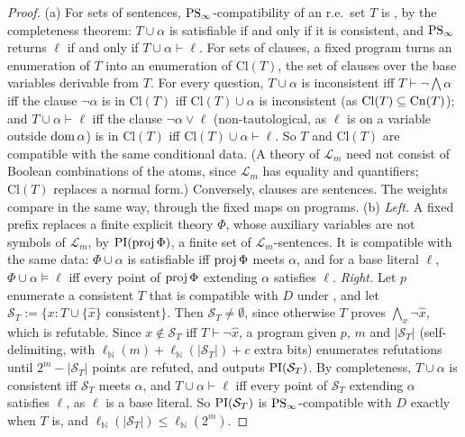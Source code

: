 \begin{proof}
(a) For sets of sentences, $\mathrm{PS}_\infty$-compatibility of an r.e.\ set $T$ is \Ethree, by the completeness theorem: $T\cup\alpha$ is satisfiable if and only if it is consistent, and $\mathrm{PS}_\infty$ returns $\ell$ if and only if $T\cup\alpha\vdash\ell$. For sets of clauses, a fixed program turns an enumeration of $T$ into an enumeration of $\mathrm{Cl}(T)$, the set of clauses over the base variables derivable from $T$. For every question, $T\cup\alpha$ is inconsistent iff $T\vdash\neg\bigwedge\alpha$ iff the clause $\neg\alpha$ is in $\mathrm{Cl}(T)$ iff $\mathrm{Cl}(T)\cup\alpha$ is inconsistent (as $\mathrm{Cl}(T)\subseteq\mathrm{Cn}(T)$); and $T\cup\alpha\vdash\ell$ iff the clause $\neg\alpha\vee\ell$ (non-tautological, as $\ell$ is on a variable outside $\operatorname{dom}\alpha$) is in $\mathrm{Cl}(T)$ iff $\mathrm{Cl}(T)\cup\alpha\vdash\ell$. So $T$ and $\mathrm{Cl}(T)$ are compatible with the same conditional data. (A theory of $\mathcal L_m$ need not consist of Boolean combinations of the atoms, since $\mathcal L_m$ has equality and quantifiers; $\mathrm{Cl}(T)$ replaces a normal form.) Conversely, clauses are sentences. The weights compare in the same way, through the fixed maps on programs.
(b) \emph{Left.} A fixed prefix replaces a finite explicit theory $\Phi$, whose auxiliary variables are not symbols of $\mathcal L_m$, by $\mathrm{PI}(\operatorname{proj}\Phi)$, a finite set of $\mathcal L_m$-sentences. It is compatible with the same data: $\Phi\cup\alpha$ is satisfiable iff $\operatorname{proj}\Phi$ meets $\alpha$, and for a base literal $\ell$, $\Phi\cup\alpha\models\ell$ iff every point of $\operatorname{proj}\Phi$ extending $\alpha$ satisfies $\ell$. \emph{Right.} Let $p$ enumerate a consistent $T$ that is compatible with $D$ under \Ethree, and let $\mathcal S_T:=\{x:T\cup\{\hat x\}\text{ consistent}\}$. Then $\mathcal S_T\ne\emptyset$, since otherwise $T$ proves $\bigwedge_x\neg\hat x$, which is refutable. Since $x\notin\mathcal S_T$ iff $T\vdash\neg\hat x$, a program given $p$, $m$ and $\lvert\mathcal S_T\rvert$ (self-delimiting, with $\ell_{\mathbb N}(m)+\ell_{\mathbb N}(\lvert\mathcal S_T\rvert)+c$ extra bits) enumerates refutations until $2^m-\lvert\mathcal S_T\rvert$ points are refuted, and outputs $\mathrm{PI}(\mathcal S_T)$. By completeness, $T\cup\alpha$ is consistent iff $\mathcal S_T$ meets $\alpha$, and $T\cup\alpha\vdash\ell$ iff every point of $\mathcal S_T$ extending $\alpha$ satisfies $\ell$, as $\ell$ is a base literal. So $\mathrm{PI}(\mathcal S_T)$ is $\mathrm{PS}_\infty$-compatible with $D$ exactly when $T$ is, and $\ell_{\mathbb N}(\lvert\mathcal S_T\rvert)\le\ell_{\mathbb N}(2^m)$.
\end{proof}

